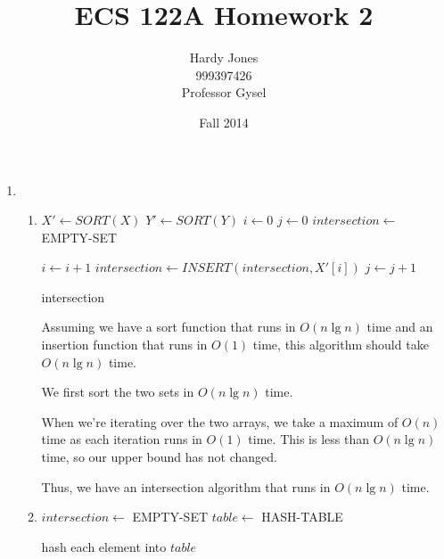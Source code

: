 \documentclass[12pt,letterpaper]{article}
\title{ECS 122A Homework 2\vspace{-2ex}}
\author{Hardy Jones\\
        999397426\\
        Professor Gysel\vspace{-2ex}}
\date{Fall 2014}
\begin{document}
  \maketitle

  \begin{enumerate}
    \item
      \begin{enumerate}
        \item
          \begin{algorithmic}
              \State $X' \gets SORT(X)$
              \State $Y' \gets SORT(Y)$
              \State $i \gets 0$
              \State $j \gets 0$
              \State $intersection \gets$ EMPTY-SET

                  \State $i \gets i + 1$
                  \State $intersection \gets INSERT(intersection, X'[i])$
                  \State $j \gets j + 1$
                \EndIf
              \EndWhile

              \Return intersection

            \EndFunction
          \end{algorithmic}

          Assuming we have a sort function that runs in $O(n \lg n)$ time
          and an insertion function that runs in $O(1)$ time,
          this algorithm should take $O(n \lg n)$ time.

          We first sort the two sets in $O(n \lg n)$ time.

          When we're iterating over the two arrays, we take a maximum of $O(n)$ time
          as each iteration runs in $O(1)$ time.
          This is less than $O(n \lg n)$ time, so our upper bound has not changed.

          Thus, we have an intersection algorithm that runs in $O(n \lg n)$ time.

        \item
          \begin{algorithmic}
              \State $intersection \gets$ EMPTY-SET
              \State $table \gets$ HASH-TABLE

                \State hash each element into $table$
              \EndFor


\end{algorithmic}
\end{enumerate}
\end{enumerate}
\end{document}
